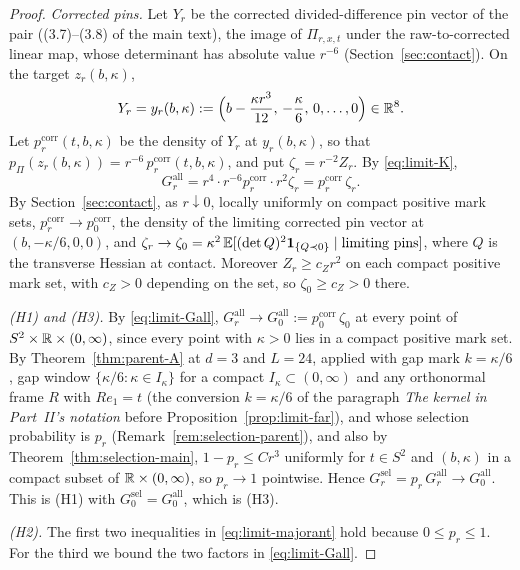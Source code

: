 \begin{proof}
\emph{Corrected pins.} Let $Y_r$ be the corrected divided-difference pin vector of the pair ((3.7)--(3.8) of the main text), the image of $\Pi_{r,x,t}$ under the raw-to-corrected linear map, whose determinant has absolute value $r^{-6}$ (Section~\ref{sec:contact}). On the target $z_r(b,\kappa)$,
\begin{equation}\label{eq:limit-target}
Y_r=y_r(b,\kappa):=\Bigl(b-\frac{\kappa r^3}{12},\,-\frac\kappa6,\,0,\dots,0\Bigr)\in\mathbb R^8 .
\end{equation}
Let $p^{\mathrm{corr}}_r(t,b,\kappa)$ be the density of $Y_r$ at $y_r(b,\kappa)$, so that $p_\Pi(z_r(b,\kappa))=r^{-6}\,p^{\mathrm{corr}}_r(t,b,\kappa)$, and put $\zeta_r=r^{-2}Z_r$. By \eqref{eq:limit-K},
\begin{equation}\label{eq:limit-Gall}
G^{\mathrm{all}}_r=r^4\cdot r^{-6}p^{\mathrm{corr}}_r\cdot r^2\zeta_r=p^{\mathrm{corr}}_r\,\zeta_r .
\end{equation}
By Section~\ref{sec:contact}, as $r\downarrow0$, locally uniformly on compact positive mark sets, $p^{\mathrm{corr}}_r\to p^{\mathrm{corr}}_0$, the density of the limiting corrected pin vector at $(b,-\kappa/6,0,0)$, and $\zeta_r\to\zeta_0=\kappa^2\,\mathbb E[(\det Q)^2\mathbf 1_{\{Q\prec0\}}\mid\text{limiting pins}]$, where $Q$ is the transverse Hessian at contact. Moreover $Z_r\ge c_Zr^2$ on each compact positive mark set, with $c_Z>0$ depending on the set, so $\zeta_0\ge c_Z>0$ there.

\emph{(H1) and (H3).} By \eqref{eq:limit-Gall}, $G^{\mathrm{all}}_r\to G^{\mathrm{all}}_0:=p^{\mathrm{corr}}_0\,\zeta_0$ at every point of $S^2\times\mathbb R\times(0,\infty)$, since every point with $\kappa>0$ lies in a compact positive mark set. By Theorem~\ref{thm:parent-A} at $d=3$ and $L=24$, applied with gap mark $k=\kappa/6$, gap window $\{\kappa/6:\kappa\in I_\kappa\}$ for a compact $I_\kappa\subset(0,\infty)$ and any orthonormal frame $R$ with $Re_1=t$ (the conversion $k=\kappa/6$ of the paragraph \emph{The kernel in Part~II's notation} before Proposition~\ref{prop:limit-far}), and whose selection probability is $p_r$ (Remark~\ref{rem:selection-parent}), and also by Theorem~\ref{thm:selection-main}, $1-p_r\le Cr^3$ uniformly for $t\in S^2$ and $(b,\kappa)$ in a compact subset of $\mathbb R\times(0,\infty)$, so $p_r\to1$ pointwise. Hence $G^{\mathrm{sel}}_r=p_r\,G^{\mathrm{all}}_r\to G^{\mathrm{all}}_0$. This is (H1) with $G^{\mathrm{sel}}_0=G^{\mathrm{all}}_0$, which is (H3).

\emph{(H2).} The first two inequalities in \eqref{eq:limit-majorant} hold because $0\le p_r\le1$. For the third we bound the two factors in \eqref{eq:limit-Gall}.


\end{proof}
